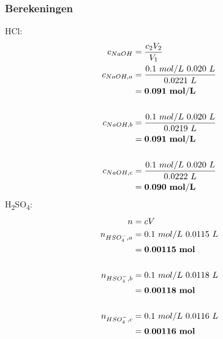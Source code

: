 \documentclass[10pt,twoside]{report}
\begin{document}
\subsubsection{Berekeningen}
\begin{multicols}{2}
    HCl:\\
    \begin{equation*}
        \begin{split}
            c_{NaOH} &= \frac{c_2V_2}{V_1}\\
            c_{NaOH,a} &= \frac{0.1\ mol/L\ 0.020\ L}{0.0221\ L}\\
                    &= \bold{0.091\ mol/L}\\\\
            c_{NaOH,b} &= \frac{0.1\ mol/L\ 0.020\ L}{0.0219\ L}\\
                    &= \bold{0.091\ mol/L}\\\\
            c_{NaOH,c} &= \frac{0.1\ mol/L\ 0.020\ L}{0.0222\ L}\\
                    &= \bold{0.090\ mol/L}\\
        \end{split}
    \end{equation*}
\break
    H\textsubscript{2}SO\textsubscript{4}:\\
    \begin{equation*}
        \begin{split}
            n &= cV\\
            n_{HSO_4^-,a} &= 0.1\ mol/L\ 0.0115\ L\\
                &= \bold{0.00115\ mol}\\\\
            n_{HSO_4^-,b} &= 0.1\ mol/L\ 0.0118\ L\\
                &= \bold{0.00118\ mol}\\\\
            n_{HSO_4^-,c} &= 0.1\ mol/L\ 0.0116\ L\\
                &= \bold{0.00116\ mol}\\\\
        \end{split}
    \end{equation*}
\end{multicols}
\end{document}
